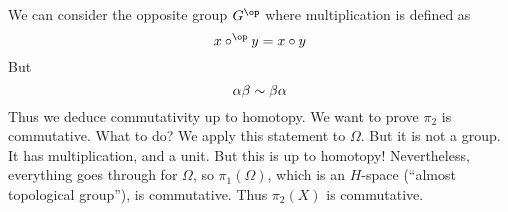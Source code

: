 We can consider the opposite group $G^{\op}$ where multiplication
is defined as
\begin{equation}
x\circ^{\op}y=x\circ y
\end{equation}
But
\begin{equation}
\alpha\beta\sim\beta\alpha
\end{equation}
Thus we deduce commutativity up to homotopy. We want to prove
$\pi_{2}$ is commutative. What to do? We apply this statement to
$\Omega$. But it is not a group. It has multiplication, and a
unit. But this is up to homotopy! Nevertheless, everything goes
through for $\Omega$, so $\pi_{1}(\Omega)$, which is an $H$-space
(``almost topological group''), is commutative. Thus $\pi_{2}(X)$
is commutative.
